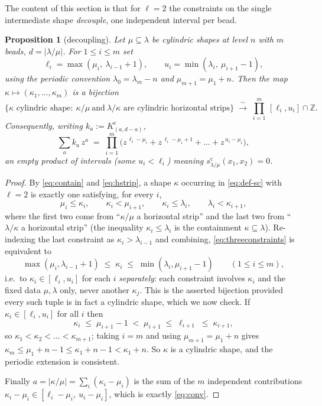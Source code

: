 \documentclass[11pt]{article}
\newtheorem{proposition}[theorem]{Proposition}
\theoremstyle{definition}
\newcommand{\Z}{\mathbb{Z}}
\newcommand{\scy}{s^{\mathrm{c}}}
\newcommand{\Kc}{K^{\mathrm{c}}}
\begin{document}
The content of this section is that for $\ell=2$ the constraints on the single intermediate
shape \emph{decouple}, one independent interval per bead.

\begin{proposition}[decoupling]\label{prop:decouple}
Let $\mu\subseteq\lambda$ be cylindric shapes at level $n$ with $m$ beads, $d=|\lambda/\mu|$.
For $1\le i\le m$ set
\begin{equation}\label{eq:intervals}
  \ell_i=\max(\mu_i,\ \lambda_{i-1}+1),\qquad
  u_i=\min(\lambda_i,\ \mu_{i+1}-1),
\end{equation}
using the periodic convention $\lambda_0=\lambda_m-n$ and $\mu_{m+1}=\mu_1+n$. Then the map
$\kappa\mapsto(\kappa_1,\dots,\kappa_m)$ is a bijection
\[
  \{\kappa \text{ cylindric shape}:\ \kappa/\mu\ \text{and}\ \lambda/\kappa
    \text{ are cylindric horizontal strips}\}
  \;\xrightarrow{\ \sim\ }\;
  \prod_{i=1}^{m}\,[\ell_i,u_i]\cap\Z .
\]
Consequently, writing $k_a:=\Kc_{(a,d-a)}$,
\begin{equation}\label{eq:conv}
  \sum_{a}k_a\,z^a \;=\; \prod_{i=1}^{m} \big(z^{\,\ell_i-\mu_i}+z^{\,\ell_i-\mu_i+1}
  +\dots+z^{\,u_i-\mu_i}\big),
\end{equation}
an empty product of intervals (some $u_i<\ell_i$) meaning $\scy_{\lambda/\mu}(x_1,x_2)=0$.
\end{proposition}

\begin{proof}
By \eqref{eq:contain} and \eqref{eq:hstrip}, a shape $\kappa$ occurring in
\eqref{eq:def-sc} with $\ell=2$ is exactly one satisfying, for every $i$,
\begin{equation}\label{eq:threeconstraints}
  \mu_i\le\kappa_i, \qquad \kappa_i<\mu_{i+1}, \qquad
  \kappa_i\le\lambda_i,\qquad \lambda_i<\kappa_{i+1},
\end{equation}
where the first two come from ``$\kappa/\mu$ a horizontal strip'' and the last two from
``$\lambda/\kappa$ a horizontal strip'' (the inequality $\kappa_i\le\lambda_i$ is the
containment $\kappa\subseteq\lambda$). Re-indexing the last constraint as
$\kappa_i>\lambda_{i-1}$ and combining, \eqref{eq:threeconstraints} is equivalent to
\[
  \max(\mu_i,\lambda_{i-1}+1)\;\le\;\kappa_i\;\le\;\min(\lambda_i,\mu_{i+1}-1)
  \qquad (1\le i\le m),
\]
i.e.\ to $\kappa_i\in[\ell_i,u_i]$ for each $i$ \emph{separately}: each constraint involves
$\kappa_i$ and the fixed data $\mu,\lambda$ only, never another $\kappa_j$. This is the asserted
bijection provided every such tuple is in fact a cylindric shape, which we now check.
If $\kappa_i\in[\ell_i,u_i]$ for all $i$ then
\[
  \kappa_i\;\le\;\mu_{i+1}-1\;<\;\mu_{i+1}\;\le\;\ell_{i+1}\;\le\;\kappa_{i+1},
\]
so $\kappa_1<\kappa_2<\dots<\kappa_{m+1}$; taking $i=m$ and using $\mu_{m+1}=\mu_1+n$ gives
$\kappa_m\le\mu_1+n-1\le\kappa_1+n-1<\kappa_1+n$. So $\kappa$ is a cylindric shape, and the
periodic extension is consistent.

Finally $a=|\kappa/\mu|=\sum_i(\kappa_i-\mu_i)$ is the sum of the $m$ independent
contributions $\kappa_i-\mu_i\in[\ell_i-\mu_i,\ u_i-\mu_i]$, which is exactly
\eqref{eq:conv}.
\end{proof}
\end{document}
